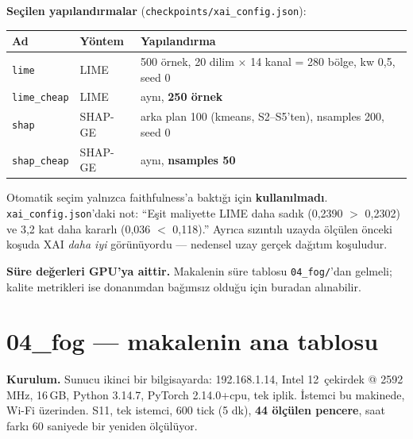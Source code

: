 \documentclass[11pt,a4paper]{report}
\newcommand{\kod}[1]{\texttt{\small #1}}
\newcommand{\dosya}[1]{\texttt{\footnotesize #1}}
\begin{document}
\textbf{Seçilen yapılandırmalar} (\dosya{checkpoints/xai\_config.json}):

\begin{table}[H]
\centering\small
\begin{tabular}{@{}llp{7.3cm}@{}}
\toprule
\textbf{Ad} & \textbf{Yöntem} & \textbf{Yapılandırma} \\
\midrule
\kod{lime}       & LIME & 500 örnek, 20 dilim $\times$ 14 kanal = 280 bölge, kw 0{,}5, seed 0 \\
\kod{lime\_cheap} & LIME & aynı, \textbf{250 örnek} \\
\kod{shap}       & SHAP-GE & arka plan 100 (kmeans, S2--S5'ten), nsamples 200, seed 0 \\
\kod{shap\_cheap} & SHAP-GE & aynı, \textbf{nsamples 50} \\
\bottomrule
\end{tabular}
\end{table}

\begin{uyari}
Otomatik seçim yalnızca faithfulness'a baktığı için \textbf{kullanılmadı}.
\dosya{xai\_config.json}'daki not: ``Eşit maliyette LIME daha sadık
(0{,}2390 $>$ 0{,}2302) ve 3{,}2 kat daha kararlı (0{,}036 $<$ 0{,}118).''
Ayrıca sızıntılı uzayda ölçülen önceki koşuda XAI \emph{daha iyi} görünüyordu
--- nedensel uzay gerçek dağıtım koşuludur.

\textbf{Süre değerleri GPU'ya aittir.} Makalenin süre tablosu
\dosya{04\_fog/}'dan gelmeli; kalite metrikleri ise donanımdan bağımsız olduğu
için buradan alınabilir.
\end{uyari}

\section{04\_fog --- makalenin ana tablosu}
\label{sec:fog}

\textbf{Kurulum.} Sunucu ikinci bir bilgisayarda: 192.168.1.14, Intel
12~çekirdek @ 2592\,MHz, 16\,GB, Python 3.14.7, PyTorch 2.14.0+cpu, tek iplik.
İstemci bu makinede, Wi-Fi üzerinden. S11, tek istemci, 600 tick (5 dk), \textbf{44 ölçülen pencere},
saat farkı 60 saniyede bir yeniden ölçülüyor.
\end{document}

